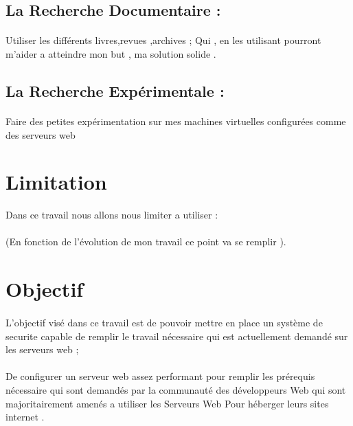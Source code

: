     \subsection{La Recherche Documentaire :}
    \paragraph{ }
    Utiliser les différents livres,revues ,archives ;
    Qui , en les utilisant pourront m'aider a atteindre mon but , ma solution solide .
  \subsection{ La Recherche Expérimentale :}
  \paragraph{ }
  Faire des petites expérimentation sur mes machines virtuelles configurées comme des serveurs web  
  \section{Limitation}
  Dans ce travail nous allons nous limiter a utiliser :
  \paragraph{ } (En fonction de l’évolution de mon travail ce point va se remplir ).
  \section{Objectif}
  
  \paragraph{ }L'objectif visé  dans ce travail est de pouvoir mettre en place un système de securite capable de remplir le travail nécessaire qui est actuellement demandé  sur les serveurs web ;
  \paragraph{ } De configurer un serveur web assez performant pour remplir les prérequis    nécessaire qui sont demandés par la communauté  des développeurs   Web qui sont majoritairement amenés a utiliser les Serveurs Web Pour héberger leurs sites internet  .

 
   
   

   
   
     
 
